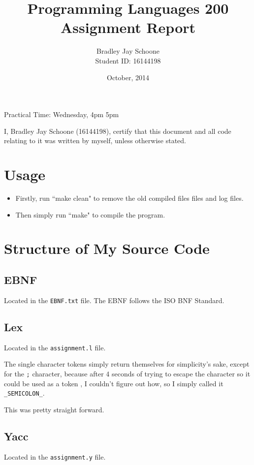 \documentclass[a4paper,12pt,notitlepage]{article}
\title{Programming Languages 200 Assignment Report}
\author{Bradley Jay Schoone\\Student ID: 16144198}
\date{October, 2014}
\begin{document}
\maketitle

\begin{center}
Practical Time: Wednesday, 4pm \- 5pm
\end{center}

\begin{center}
I, Bradley Jay Schoone (16144198), certify that this document and all code relating to it was written by myself, unless otherwise stated.
\end{center}
\clearpage
\section{Usage}
\begin{itemize}
  \item Firstly, run ``make clean" to remove the old compiled files files and log files.
  \item Then simply run ``make" to compile the program.
\end{itemize}

\section{Structure of My Source Code}

\subsection{EBNF}
Located in the \texttt{EBNF.txt} file.
The EBNF follows the ISO BNF Standard.

\subsection{Lex}
Located in the \texttt{assignment.l} file.

The single character tokens simply return themselves for simplicity's sake, except for the \texttt{;} character, because after 4 seconds of trying to escape the character so it could be used as a token , I couldn't figure out how, so I simply called it \texttt{\_SEMICOLON\_}.

This was pretty straight forward.


\subsection{Yacc}
Located in the \texttt{assignment.y} file.
\end{document}
